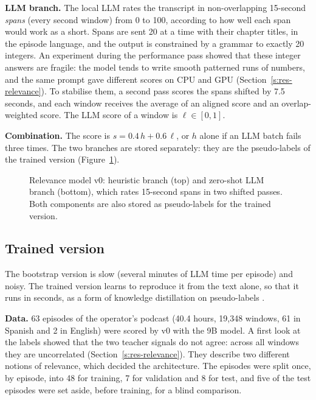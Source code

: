 \textbf{LLM branch.} The local LLM rates the transcript in non-overlapping 15-second \textit{spans} (every second window) from 0 to 100, according to how well each span would work as a short. Spans are sent 20 at a time with their chapter titles, in the episode language, and the output is constrained by a grammar to exactly 20 integers. An experiment during the performance pass showed that these integer answers are fragile: the model tends to write smooth patterned runs of numbers, and the same prompt gave different scores on CPU and GPU (Section~\ref{s:res-relevance}). To stabilise them, a second pass scores the spans shifted by 7.5 seconds, and each window receives the average of an aligned score and an overlap-weighted score. The LLM score of a window is $\ell \in [0,1]$.

\textbf{Combination.} The score is $s = 0.4\,h + 0.6\,\ell$, or $h$ alone if an LLM batch fails three times. The two branches are stored separately: they are the pseudo-labels of the trained version (Figure~\ref{fig:relevance}).

\begin{figure}[H]
\centering
{}
\caption{Relevance model v0: heuristic branch (top) and zero-shot LLM branch (bottom), which rates 15-second spans in two shifted passes. Both components are also stored as pseudo-labels for the trained version.}
\label{fig:relevance}
\end{figure}

\subsection*{Trained version}

The bootstrap version is slow (several minutes of LLM time per episode) and noisy. The trained version learns to reproduce it from the text alone, so that it runs in seconds, as a form of knowledge distillation \cite{hinton2015distilling} on pseudo-labels \cite{lee2013pseudolabel}.

\textbf{Data.} 63 episodes of the operator's podcast (40.4 hours, 19{,}348 windows, 61 in Spanish and 2 in English) were scored by v0 with the 9B model. A first look at the labels showed that the two teacher signals do not agree: across all windows they are uncorrelated (Section~\ref{s:res-relevance}). They describe two different notions of relevance, which decided the architecture. The episodes were split once, by episode, into 48 for training, 7 for validation and 8 for test, and five of the test episodes were set aside, before training, for a blind comparison.

